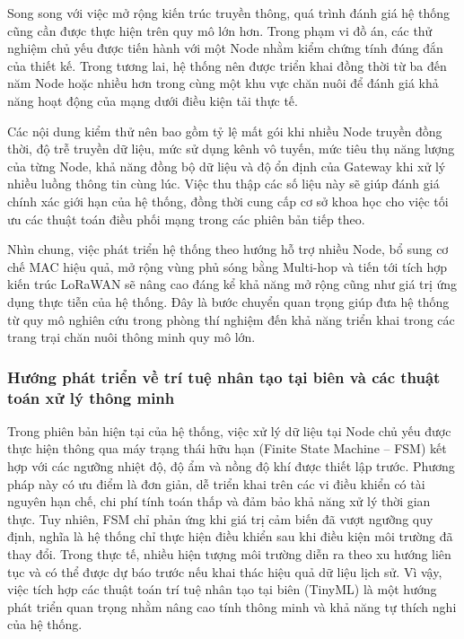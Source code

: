 Song song với việc mở rộng kiến trúc truyền thông, quá trình đánh giá hệ thống cũng cần được thực hiện trên quy mô lớn hơn. Trong phạm vi đồ án, các thử nghiệm chủ yếu được tiến hành với một Node nhằm kiểm chứng tính đúng đắn của thiết kế. Trong tương lai, hệ thống nên được triển khai đồng thời từ ba đến năm Node hoặc nhiều hơn trong cùng một khu vực chăn nuôi để đánh giá khả năng hoạt động của mạng dưới điều kiện tải thực tế.

Các nội dung kiểm thử nên bao gồm tỷ lệ mất gói khi nhiều Node truyền đồng thời, độ trễ truyền dữ liệu, mức sử dụng kênh vô tuyến, mức tiêu thụ năng lượng của từng Node, khả năng đồng bộ dữ liệu và độ ổn định của Gateway khi xử lý nhiều luồng thông tin cùng lúc. Việc thu thập các số liệu này sẽ giúp đánh giá chính xác giới hạn của hệ thống, đồng thời cung cấp cơ sở khoa học cho việc tối ưu các thuật toán điều phối mạng trong các phiên bản tiếp theo.

Nhìn chung, việc phát triển hệ thống theo hướng hỗ trợ nhiều Node, bổ sung cơ chế MAC hiệu quả, mở rộng vùng phủ sóng bằng Multi-hop và tiến tới tích hợp kiến trúc LoRaWAN sẽ nâng cao đáng kể khả năng mở rộng cũng như giá trị ứng dụng thực tiễn của hệ thống. Đây là bước chuyển quan trọng giúp đưa hệ thống từ quy mô nghiên cứu trong phòng thí nghiệm đến khả năng triển khai trong các trang trại chăn nuôi thông minh quy mô lớn.

\subsubsection{Hướng phát triển về trí tuệ nhân tạo tại biên và các thuật toán xử lý thông minh}

Trong phiên bản hiện tại của hệ thống, việc xử lý dữ liệu tại Node chủ yếu được thực hiện thông qua máy trạng thái hữu hạn (Finite State Machine -- FSM) kết hợp với các ngưỡng nhiệt độ, độ ẩm và nồng độ khí được thiết lập trước. Phương pháp này có ưu điểm là đơn giản, dễ triển khai trên các vi điều khiển có tài nguyên hạn chế, chi phí tính toán thấp và đảm bảo khả năng xử lý thời gian thực. Tuy nhiên, FSM chỉ phản ứng khi giá trị cảm biến đã vượt ngưỡng quy định, nghĩa là hệ thống chỉ thực hiện điều khiển sau khi điều kiện môi trường đã thay đổi. Trong thực tế, nhiều hiện tượng môi trường diễn ra theo xu hướng liên tục và có thể được dự báo trước nếu khai thác hiệu quả dữ liệu lịch sử. Vì vậy, việc tích hợp các thuật toán trí tuệ nhân tạo tại biên (TinyML) là một hướng phát triển quan trọng nhằm nâng cao tính thông minh và khả năng tự thích nghi của hệ thống.

